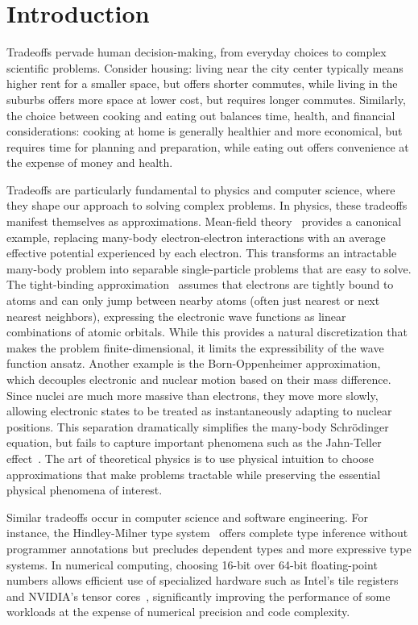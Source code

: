 \chapter{Introduction}\label{ch:intro}

Tradeoffs pervade human decision-making, from everyday choices to complex scientific problems. Consider housing: living near the city center typically means higher rent for a smaller space, but offers shorter commutes, while living in the suburbs offers more space at lower cost, but requires longer commutes. Similarly, the choice between cooking and eating out balances time, health, and financial considerations: cooking at home is generally healthier and more economical, but requires time for planning and preparation, while eating out offers convenience at the expense of money and health.

Tradeoffs are particularly fundamental to physics and computer science, where they shape our approach to solving complex problems. In physics, these tradeoffs manifest themselves as approximations. Mean-field theory~\cite{Bruus2004ManyBody} provides a canonical example, replacing many-body electron-electron interactions with an average effective potential experienced by each electron. This transforms an intractable many-body problem into separable single-particle problems that are easy to solve. The tight-binding approximation~\cite{Kittel2005IntroductionTo,Vonsov2012QuantumSolidS} assumes that electrons are tightly bound to atoms and can only jump between nearby atoms (often just nearest or next nearest neighbors), expressing the electronic wave functions as linear combinations of atomic orbitals. While this provides a natural discretization that makes the problem finite-dimensional, it limits the expressibility of the wave function ansatz. Another example is the Born-Oppenheimer approximation, which decouples electronic and nuclear motion based on their mass difference. Since nuclei are much more massive than electrons, they move more slowly, allowing electronic states to be treated as instantaneously adapting to nuclear positions. This separation dramatically simplifies the many-body Schrödinger equation, but fails to capture important phenomena such as the Jahn-Teller effect~\cite{Vonsov2012QuantumSolidS}. The art of theoretical physics is to use physical intuition to choose approximations that make problems tractable while preserving the essential physical phenomena of interest.

Similar tradeoffs occur in computer science and software engineering. For instance, the Hindley-Milner type system~\cite{Hindle_1969_The_Principal_T,Milner_1978_A_theory_of_typ} offers complete type inference without programmer annotations but precludes dependent types and more expressive type systems. In numerical computing, choosing 16-bit over 64-bit floating-point numbers allows efficient use of specialized hardware such as Intel's tile registers~\cite{Intel_AMX} and NVIDIA's tensor cores~\cite{NvidiaTensorCores}, significantly improving the performance of some workloads at the expense of numerical precision and code complexity.

